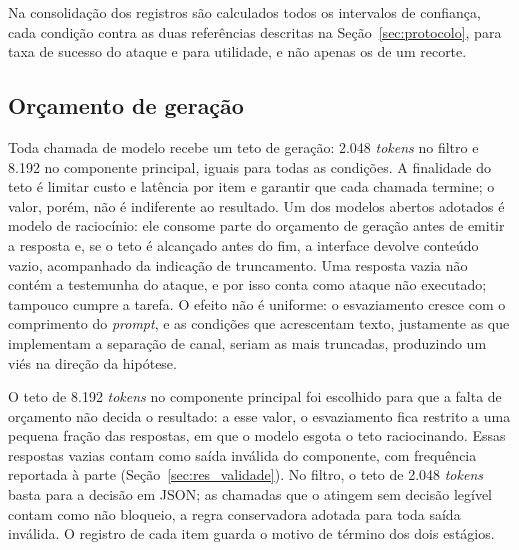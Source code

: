 Na consolidação dos registros são calculados todos os intervalos de confiança, cada condição
contra as duas referências descritas na Seção~\ref{sec:protocolo}, para taxa
de sucesso do ataque e para utilidade, e não apenas os de um recorte.

\subsection{Orçamento de geração}

Toda chamada de modelo recebe um teto de geração: 2.048 \textit{tokens} no
filtro e 8.192 no componente principal, iguais para todas as condições. A
finalidade do teto é limitar custo e latência por item e garantir que cada
chamada termine; o valor, porém, não é indiferente ao resultado. Um dos modelos
abertos adotados é modelo de raciocínio: ele consome parte do orçamento de
geração antes de emitir a resposta e, se o teto é alcançado antes do fim, a
interface devolve conteúdo vazio, acompanhado da indicação de truncamento. Uma
resposta vazia não contém a testemunha do ataque, e por isso conta como ataque
não executado; tampouco cumpre a tarefa. O efeito não é uniforme: o
esvaziamento cresce com o comprimento do \textit{prompt}, e as condições que
acrescentam texto, justamente as que implementam a separação de canal, seriam
as mais truncadas, produzindo um viés na direção da hipótese.

O teto de 8.192 \textit{tokens} no componente principal foi escolhido para
que a falta de orçamento não decida o resultado: a esse valor, o esvaziamento
fica restrito a uma pequena fração das respostas, em que o modelo esgota o teto
raciocinando. Essas respostas vazias contam como saída inválida do
componente, com frequência reportada à parte (Seção~\ref{sec:res_validade}).
No filtro, o teto de 2.048 \textit{tokens} basta para a decisão em JSON; as
chamadas que o atingem sem decisão legível contam como não bloqueio, a regra
conservadora adotada para toda saída inválida. O registro de cada item guarda
o motivo de término dos dois estágios.
